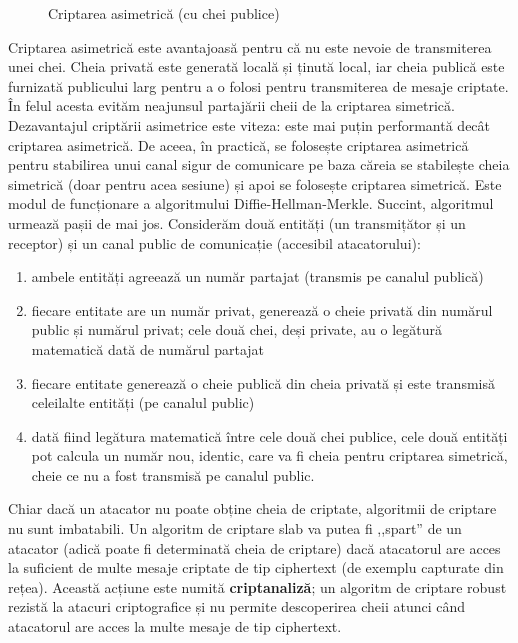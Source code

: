 \begin{figure}[htbp]
  \centering
  \def\svgwidth{\columnwidth}
  
  \caption{Criptarea asimetrică (cu chei publice)}
  \label{fig:sec:asymmetric-encryption}
\end{figure}

Criptarea asimetrică este avantajoasă pentru că nu este nevoie de transmiterea unei chei. Cheia privată este generată locală și ținută local, iar cheia publică este furnizată publicului larg pentru a o folosi pentru transmiterea de mesaje criptate. În felul acesta evităm neajunsul partajării cheii de la criptarea simetrică. Dezavantajul criptării asimetrice este viteza: este mai puțin performantă decât criptarea asimetrică. De aceea, în practică, se folosește criptarea asimetrică pentru stabilirea unui canal sigur de comunicare pe baza căreia se stabilește cheia simetrică (doar pentru acea sesiune) și apoi se folosește criptarea simetrică. Este modul de funcționare a algoritmului Diffie-Hellman-Merkle. Succint, algoritmul urmează pașii de mai jos. Considerăm două entități (un transmițător și un receptor) și un canal public de comunicație (accesibil atacatorului):

\begin{enumerate}
  \item ambele entități agreează un număr partajat (transmis pe canalul publică)
  \item fiecare entitate are un număr privat, generează o cheie privată din numărul public și numărul privat; cele două chei, deși private, au o legătură matematică dată de numărul partajat
  \item fiecare entitate generează o cheie publică din cheia privată și este transmisă celeilalte entități (pe canalul public)
  \item dată fiind legătura matematică între cele două chei publice, cele două entități pot calcula un număr nou, identic, care va fi cheia pentru criptarea simetrică, cheie ce nu a fost transmisă pe canalul public.
\end{enumerate}

Chiar dacă un atacator nu poate obține cheia de criptate, algoritmii de criptare nu sunt imbatabili. Un algoritm de criptare slab va putea fi ,,spart'' de un atacator (adică poate fi determinată cheia de criptare) dacă atacatorul are acces la suficient de multe mesaje criptate de tip ciphertext (de exemplu capturate din rețea). Această acțiune este numită \textbf{criptanaliză}; un algoritm de criptare robust rezistă la atacuri criptografice și nu permite descoperirea cheii atunci când atacatorul are acces la multe mesaje de tip ciphertext.

